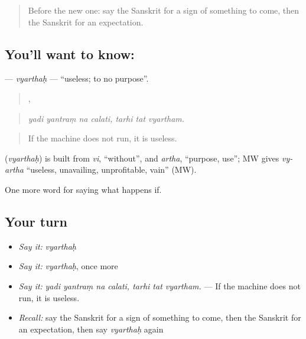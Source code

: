 \label{lesson:SA-C390-vyarthah}



\begin{quote}
Before the new one: say the Sanskrit for a sign of something to come, then the Sanskrit for an expectation.
\end{quote}

\subsection*{You'll want to know: }
\textbf{} — \emph{vyarthaḥ} — \textquotedblleft{}useless; to no purpose\textquotedblright{}.

\begin{quote}
   ,   
\end{quote}

\begin{quote}
\emph{yadi yantraṃ na calati, tarhi tat vyartham.}
\end{quote}

\begin{quote}
If the machine does not run, it is useless.
\end{quote}

\begin{cousinweb}
\textbf{} (\emph{vyarthaḥ}) is built from \emph{vi}, \textquotedblleft{}without\textquotedblright{}, and \emph{artha}, \textquotedblleft{}purpose, use\textquotedblright{}; MW gives \emph{vy-artha} \textquotedblleft{}useless, unavailing, unprofitable, vain\textquotedblright{} (MW).
\end{cousinweb}

\begin{grammarlens}[title={What you've built}]
One more word for saying what happens if.
\end{grammarlens}

\subsection*{Your turn}
\begin{itemize}
\raggedright
  \item \emph{Say it:} \emph{vyarthaḥ}
  \item \emph{Say it:} \emph{vyarthaḥ}, once more
  \item \emph{Say it:} \emph{yadi yantraṃ na calati, tarhi tat vyartham.} — If the machine does not run, it is useless.
  \item \emph{Recall:} say the Sanskrit for a sign of something to come, then the Sanskrit for an expectation, then say \emph{vyarthaḥ} again
\end{itemize}

